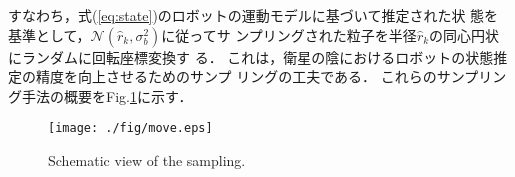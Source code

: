 \documentclass[a4paper,10pt,twocolumn,fleqn]{jsarticle}
\begin{document}
すなわち，式(\ref{eq:state})のロボットの運動モデルに基づいて推定された状
態を基準として，$\mathcal{N}\left(\hat{r}_k,\sigma^2_b\right)$に従ってサ
ンプリングされた粒子を半径$\hat{r}_k$の同心円状にランダムに回転座標変換す
る．
%
これは，衛星の陰におけるロボットの状態推定の精度を向上させるためのサンプ
リングの工夫である．
%
%
これらのサンプリング手法の概要をFig.\ref{fig:movemove}に示す．
% 
\begin{figure}[bp]
 \centering
 \texttt{[image: ./fig/move.eps]}
 \caption{Schematic view of the sampling.}
 \label{fig:movemove}
\end{figure}

\vspace{-10mm}
\end{document}
